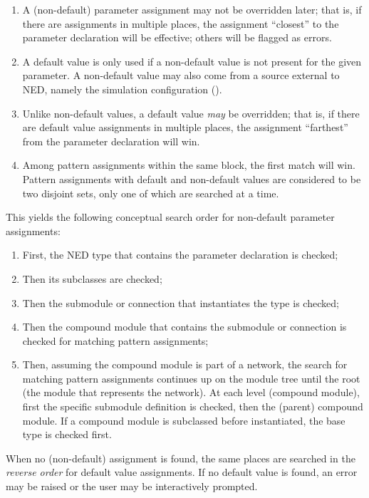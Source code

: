 \begin{enumerate}
  \item A (non-default) parameter assignment may not be overridden later;
    that is, if there are assignments in multiple places, the assignment
    ``closest'' to the parameter declaration will be effective; others
    will be flagged as errors.
  \item A default value is only used if a non-default value is not present
    for the given parameter. A non-default value may also come from a source
    external to NED, namely the simulation configuration ().
  \item Unlike non-default values, a default value \textit{may} be overridden;
    that is, if there are default value assignments in multiple places,
    the assignment ``farthest'' from the parameter declaration will win.
  \item Among pattern assignments within the same 
    block, the first match will win. Pattern assignments with default and
    non-default values are considered to be two disjoint sets, only one of
    which are searched at a time.
\end{enumerate}

This yields the following conceptual search order for non-default parameter
assignments:

\begin{enumerate}
  \item First, the NED type that contains the parameter declaration is checked;
  \item Then its subclasses are checked;
  \item Then the submodule or connection that instantiates the type is checked;
  \item Then the compound module that contains the submodule or connection is
    checked for matching pattern assignments;
  \item Then, assuming the compound module is part of a network, the search
    for matching pattern assignments continues up on the module tree until the root
    (the module that represents the network). At each level (compound module),
    first the specific submodule definition is checked, then the (parent) compound module.
    If a compound module is subclassed before instantiated, the base type is checked
    first.
\end{enumerate}

When no (non-default) assignment is found, the same places are searched in the
\textit{reverse order} for default value assignments. If no default value is
found, an error may be raised or the user may be interactively prompted.

